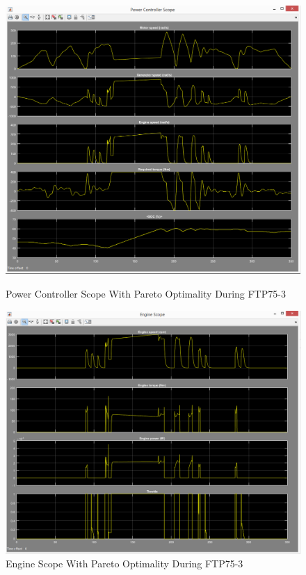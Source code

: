 \begin{figure}[hp]
\centering
\includegraphics[scale=0.47]{figures/Pareto/FTP75-3/powerController08Juni}
\caption{Power Controller Scope With Pareto Optimality During FTP75-3}
\label{fig:pcpo3}
\includegraphics[scale=0.46]{figures/Pareto/FTP75-3/engine08Juni}
\caption{Engine Scope With Pareto Optimality During FTP75-3}
\label{fig:epo3}
\end{figure}


